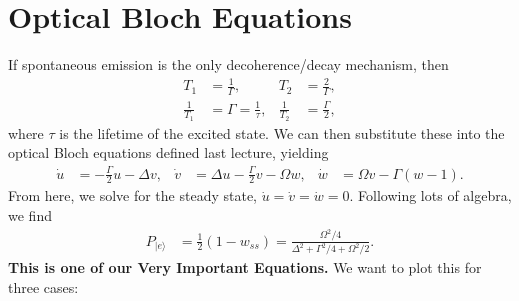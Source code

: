 \documentclass[a4paper, 11pt, normalem]{report}
\begin{document}
\section{Optical Bloch Equations}
If spontaneous emission is the only decoherence/decay mechanism, then
\begin{align}
    T_1 &= \frac{1}{\Gamma}, & T_2 &= \frac2\Gamma, \\
    \frac{1}{T_1} &= \Gamma = \frac1\tau, & \frac1{T_2} &= \frac{\Gamma}{2},
\end{align}
where $\tau$ is the lifetime of the excited state.
We can then substitute these into the optical Bloch equations defined last lecture, yielding
\begin{align}
    \dot{u} &= -\frac{\Gamma}{2}u - \Delta v, &
    \dot{v} &= \Delta u - \frac{\Gamma}{2}v - \Omega w, &
    \dot{w} &= \Omega v - \Gamma(w-1).
\end{align}
From here, we solve for the steady state, $\dot u = \dot v = \dot w = 0.$
Following lots of algebra, we find
\begin{align}
    P_{|e\rangle} &= \frac12\left(1-w_{ss}\right) = \frac{\Omega^2/4}{\Delta^2 + \Gamma^2/4 + \Omega^2/2}.
\end{align}
\textbf{This is one of our Very Important Equations.}
We want to plot this for three cases:
\end{document}
